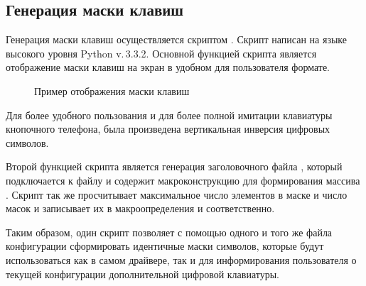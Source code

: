 \subsection{Генерация маски клавиш}
Генерация маски клавиш осуществляется скриптом .
Скрипт написан на языке высокого уровня Python v.\,3.3.2.
Основной функцией скрипта является отображение маски клавиш на экран в 
удобном для пользователя формате.
\newpar


\begin{figure}[h!]
\centering
\theverbbox
\caption*{Пример отображения маски клавиш}
\end{figure}

\par Для более удобного пользования и для более полной имитации клавиатуры кнопочного телефона,
была произведена вертикальная инверсия цифровых символов.
\newpar

Второй функцией скрипта  является генерация заголовочного
файла , который подключается к файлу  и содержит
макроконструкцию для формирования массива .
Скрипт так же просчитывает максимальное число элементов в маске и число масок и записывает
их в макроопределения  и  соответственно.
\newpar

Таким образом, один скрипт позволяет с помощью одного и того же файла конфигурации
сформировать идентичные маски символов, которые будут использоваться как в самом драйвере,
так и для информирования пользователя о текущей конфигурации дополнительной цифровой клавиатуры.
\vspace*{\fill}
\newpage
